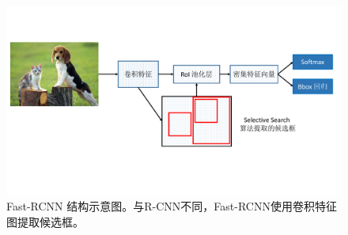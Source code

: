 \begin{figure}[t]
	\centering
	\includegraphics[trim={1.1cm, 4.2cm, 0.5cm, 2cm}, clip,width=\textwidth]{./imgs/Fast-RCNN.pdf}
	\caption{Fast-RCNN 结构示意图。与R-CNN不同，Fast-RCNN使用卷积特征图提取候选框。}
	\label{fig:fast-rcnn}
\end{figure}
